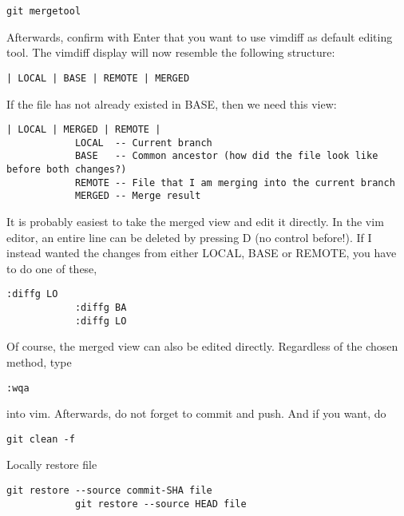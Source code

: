 \documentclass[12pt, a4paper]{article}
\numberwithin{equation}{section}
\theoremstyle{definition}
\theoremstyle{definition}
\begin{document}
		\begin{lstlisting}[style=mystylebash, label=alg:mergetool, xleftmargin=\parindent]
			git mergetool
		\end{lstlisting}

		Afterwards, confirm with Enter that you want to use vimdiff as default editing tool. The vimdiff display will now resemble the following structure: 
		
		\begin{lstlisting}[style=mystylebash, xleftmargin=\parindent]
			| LOCAL | BASE | REMOTE | MERGED
		\end{lstlisting}
		
		If the file has not already existed in BASE, then we need this view: 

		\begin{lstlisting}[style=mystylebash, xleftmargin=\parindent]	
			| LOCAL | MERGED | REMOTE |
			LOCAL  -- Current branch
			BASE   -- Common ancestor (how did the file look like before both changes?)
			REMOTE -- File that I am merging into the current branch
			MERGED -- Merge result
		\end{lstlisting}

		It is probably easiest to take the merged view and edit it directly. In the vim editor, an entire line can be deleted by pressing D (no control before!). 
		If I instead wanted the changes from either LOCAL, BASE or REMOTE, you have to do one of these,
		
		\begin{lstlisting}[style=mystylebash, label=git_merge_view__actions, xleftmargin=\parindent]
			:diffg LO
			:diffg BA
			:diffg LO
		\end{lstlisting}
		
		Of course, the merged view can also be edited directly. Regardless of the chosen method, type 
		
		\begin{lstlisting}[style=mystylebash, xleftmargin=\parindent]
			:wqa
		\end{lstlisting}
		
		into vim. Afterwards, do not forget to commit and push. And if you want, do 
		
		\begin{lstlisting}[style=mystylebash, label=alg:git_clean, xleftmargin=\parindent]
			git clean -f
		\end{lstlisting}

		Locally restore file
		
		\begin{lstlisting}[style=mystylebash, label=alg:git_restore, xleftmargin=\parindent]
			git restore --source commit-SHA file
			git restore --source HEAD file
		\end{lstlisting}
		
\end{document}
